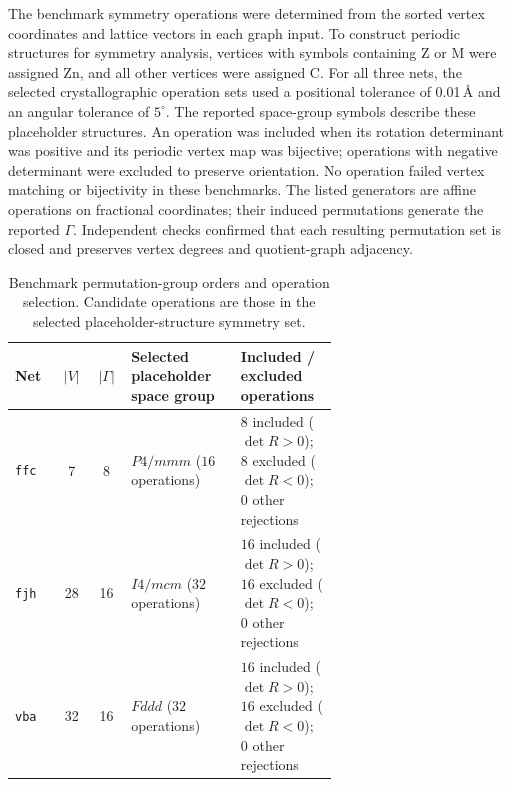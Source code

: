 \documentclass[a5paper, 10pt]{article}
\begin{document}
The benchmark symmetry operations were determined from the sorted vertex coordinates and lattice vectors in each graph input. To construct periodic structures for symmetry analysis, vertices with symbols containing Z or M were assigned Zn, and all other vertices were assigned C. For all three nets, the selected crystallographic operation sets used a positional tolerance of 0.01\,\AA{} and an angular tolerance of $5^\circ$. The reported space-group symbols describe these placeholder structures. An operation was included when its rotation determinant was positive and its periodic vertex map was bijective; operations with negative determinant were excluded to preserve orientation. No operation failed vertex matching or bijectivity in these benchmarks. The listed generators are affine operations on fractional coordinates; their induced permutations generate the reported $\Gamma$. Independent checks confirmed that each resulting permutation set is closed and preserves vertex degrees and quotient-graph adjacency.

\begin{table}[htbp]
\centering
\scriptsize
\setlength{\tabcolsep}{3pt}
\renewcommand{\arraystretch}{1.15}
\caption{Benchmark permutation-group orders and operation selection. Candidate operations are those in the selected placeholder-structure symmetry set.}
\label{tab:benchmark_symmetry}
\begin{tabular}{@{}lccp{0.34\linewidth}p{0.30\linewidth}@{}}
\toprule
Net & $|V|$ & $|\Gamma|$ & Selected placeholder space group & Included / excluded operations \\
\midrule
\texttt{ffc} & 7 & 8 & $P4/mmm$ ($16$ operations) & $8$ included ($\det R>0$); $8$ excluded ($\det R<0$); $0$ other rejections \\
\texttt{fjh} & 28 & 16 & $I4/mcm$ ($32$ operations) & $16$ included ($\det R>0$); $16$ excluded ($\det R<0$); $0$ other rejections \\
\texttt{vba} & 32 & 16 & $Fddd$ ($32$ operations) & $16$ included ($\det R>0$); $16$ excluded ($\det R<0$); $0$ other rejections \\
\bottomrule
\end{tabular}
\end{table}
\end{document}
